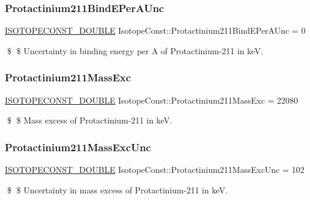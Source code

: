 \subsubsection{\texorpdfstring{Protactinium211\+Bind\+E\+Per\+A\+Unc}{Protactinium211BindEPerAUnc}}
{\footnotesize\ttfamily \mbox{\hyperlink{group___isotope_const-_macros_ga8f45a7272ce02c0b4c65c44636ed719a}{I\+S\+O\+T\+O\+P\+E\+C\+O\+N\+S\+T\+\_\+\+D\+O\+U\+B\+LE}} Isotope\+Const\+::\+Protactinium211\+Bind\+E\+Per\+A\+Unc = 0}

\$ \$ Uncertainty in binding energy per A of Protactinium-\/211 in keV. \mbox{\label{group___isotope_const-_protactinium-_pa211_ga38d5e0f6633fedf923d044a1b552395f}} 
\subsubsection{\texorpdfstring{Protactinium211\+Mass\+Exc}{Protactinium211MassExc}}
{\footnotesize\ttfamily \mbox{\hyperlink{group___isotope_const-_macros_ga8f45a7272ce02c0b4c65c44636ed719a}{I\+S\+O\+T\+O\+P\+E\+C\+O\+N\+S\+T\+\_\+\+D\+O\+U\+B\+LE}} Isotope\+Const\+::\+Protactinium211\+Mass\+Exc = 22080}

\$ \$ Mass excess of Protactinium-\/211 in keV. \mbox{\label{group___isotope_const-_protactinium-_pa211_ga8330b9bfd37bd311bd531108ef00ca90}} 
\subsubsection{\texorpdfstring{Protactinium211\+Mass\+Exc\+Unc}{Protactinium211MassExcUnc}}
{\footnotesize\ttfamily \mbox{\hyperlink{group___isotope_const-_macros_ga8f45a7272ce02c0b4c65c44636ed719a}{I\+S\+O\+T\+O\+P\+E\+C\+O\+N\+S\+T\+\_\+\+D\+O\+U\+B\+LE}} Isotope\+Const\+::\+Protactinium211\+Mass\+Exc\+Unc = 102}

\$ \$ Uncertainty in mass excess of Protactinium-\/211 in keV. \mbox{\label{group___isotope_const-_protactinium-_pa211_gaa030bd01ce760a2f13d767947d52f6b0}} 

